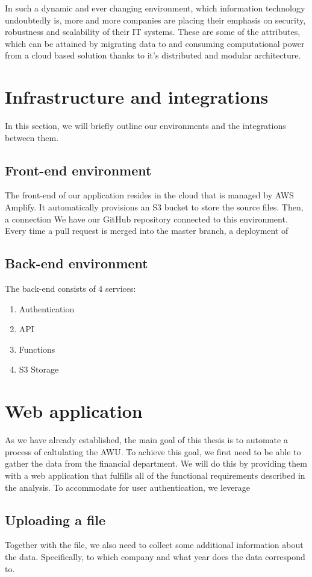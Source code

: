 \documentclass[12pt,oneside]{fithesis2}
\begin{document}
In such a dynamic and ever changing environment, which information technology undoubtedly is, more and more companies are placing their emphasis on security, robustness and scalability of their IT systems. These are some of the attributes, which can be attained by migrating data to and consuming computational power from a cloud based solution thanks to it's distributed and modular architecture.

\section{Infrastructure and integrations}
In this section, we will briefly outline our environments and the integrations between them.
\subsection{Front-end environment}
The front-end of our application resides in the cloud that is managed by AWS Amplify. It automatically provisions an S3 bucket to store the source files. Then, a connection 
We have our GitHub repository connected to this environment. Every time a pull request is merged into the master branch, a deployment of 
\subsection{Back-end environment}
The back-end consists of 4 services:
\begin{enumerate}
    \setlength\itemsep{0em}
    \item Authentication
    \item API
    \item Functions
    \item S3 Storage
\end{enumerate}
\section{Web application}
As we have already established, the main goal of this thesis is to automate a process of caltulating the AWU. To achieve this goal, we first need to be able to gather the data from the financial department. We will do this by providing them with a web application that fulfills all of the functional requirements described in the analysis.
To accommodate for user authentication, we leverage 

\subsection{Uploading a file}
Together with the file, we also need to collect some additional information about the data. Specifically, to which company and what year does the data correspond to.
\end{document}
